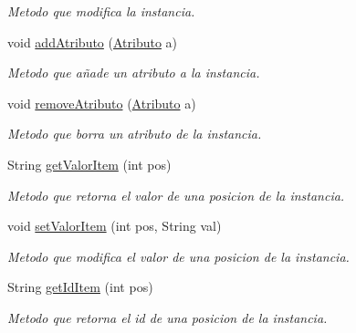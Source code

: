 \begin{DoxyCompactItemize}
\begin{DoxyCompactList}\small\item\em Metodo que modifica la instancia. \end{DoxyCompactList}\item 
void \mbox{\hyperlink{classull_1_1herramientas_1_1opendatachartgenerator_1_1_instancia_a6eca70ed005f26ffd6addb25c4e2e5c0}{add\+Atributo}} (\mbox{\hyperlink{classull_1_1herramientas_1_1opendatachartgenerator_1_1_atributo}{Atributo}} a)
\begin{DoxyCompactList}\small\item\em Metodo que añade un atributo a la instancia. \end{DoxyCompactList}\item 
void \mbox{\hyperlink{classull_1_1herramientas_1_1opendatachartgenerator_1_1_instancia_a4cda289d30c0aa006a749e7dd820ee25}{remove\+Atributo}} (\mbox{\hyperlink{classull_1_1herramientas_1_1opendatachartgenerator_1_1_atributo}{Atributo}} a)
\begin{DoxyCompactList}\small\item\em Metodo que borra un atributo de la instancia. \end{DoxyCompactList}\item 
String \mbox{\hyperlink{classull_1_1herramientas_1_1opendatachartgenerator_1_1_instancia_a1109bf93dd832c184efa93ddeff5c0c4}{get\+Valor\+Item}} (int pos)
\begin{DoxyCompactList}\small\item\em Metodo que retorna el valor de una posicion de la instancia. \end{DoxyCompactList}\item 
void \mbox{\hyperlink{classull_1_1herramientas_1_1opendatachartgenerator_1_1_instancia_afdcab4c714a973af1710250c6d50b105}{set\+Valor\+Item}} (int pos, String val)
\begin{DoxyCompactList}\small\item\em Metodo que modifica el valor de una posicion de la instancia. \end{DoxyCompactList}\item 
String \mbox{\hyperlink{classull_1_1herramientas_1_1opendatachartgenerator_1_1_instancia_ab330e4a7131b78721c37c309dfb0cd3f}{get\+Id\+Item}} (int pos)
\begin{DoxyCompactList}\small\item\em Metodo que retorna el id de una posicion de la instancia. \end{DoxyCompactList}\item 

\end{DoxyCompactItemize}
